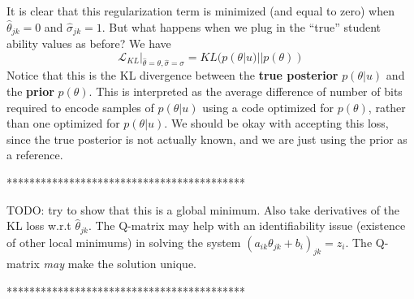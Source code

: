 \documentclass[letterpaper]{article}
\theoremstyle{definition}
\begin{document}
It is clear that this regularization term is minimized (and equal to zero) when $\hat \theta_{jk} = 0$ and $\hat \sigma_{jk} = 1$. But what happens when we plug in the ``true'' student ability values as before? We have
\begin{equation}
  \mathcal{L}_{KL} \Big|_{\hat \theta = \theta, \hat \sigma = \sigma} = KL(p(\theta | u) || p(\theta))
  \label{eq}
\end{equation}
Notice that this is the KL divergence between the \textbf{true posterior} $p(\theta |u)$ and the \textbf{prior} $p(\theta)$. This is interpreted as the average difference of number of bits required to encode samples of $p(\theta |u)$ using a code optimized for $p(\theta)$, rather than one optimized for $p(\theta | u)$. We should be okay with accepting this loss, since the true posterior is not actually known, and we are just using the prior as a reference.

******************************************

TODO: try to show that this is a global minimum. Also take derivatives of the KL loss w.r.t $\hat \theta_{jk}$. The Q-matrix may help with an identifiability issue (existence of other local minimums) in solving the system $(a_{ik}\theta_{jk} + b_i)_{jk} = z_i$. The Q-matrix \textit{may} make the solution unique.

******************************************
\end{document}
